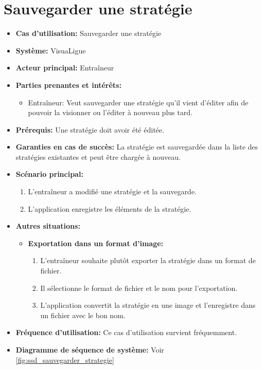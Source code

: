\newpage
\section{Sauvegarder une stratégie}
\label{sec:exporter_une_strategie}
\begin{itemize}
    \item \textbf{Cas d'utilisation:} Sauvegarder une strat\'egie
    \item \textbf{Syst\`eme:} VisuaLigue
    \item \textbf{Acteur principal:} Entra\^ineur
    \item \textbf{Parties prenantes et int\'er\^ets:}
        \begin{itemize}
            \item Entraîneur: Veut sauvegarder une stratégie qu'il vient d'éditer afin de pouvoir la visionner ou l'éditer à nouveau plus tard.
        \end{itemize}
    \item \textbf{Pr\'erequis:} Une stratégie doit avoir été éditée.
    \item \textbf{Garanties en cas de succ\`es:} La stratégie est sauvegardée dans la liste des stratégies existantes et peut être chargée à nouveau.
    \item \textbf{Sc\'enario principal:}
        \begin{enumerate}
            \item L'entra\^ineur a modifié une strat\'egie et la sauvegarde.
            \item L'application enregistre les \'el\'ements de la strat\'egie.
        \end{enumerate}
    \item \textbf{Autres situations:}
        \begin{itemize}
            \item \textbf{Exportation dans un format d'image:}
                \begin{enumerate}
                    \item L'entra\^ineur souhaite plut\^ot exporter la strat\'egie dans un format de fichier.
                    \item Il s\'electionne le format de fichier et le nom pour l'exportation.
                    \item L'application convertit la strat\'egie en une image et l'enregistre dans un fichier avec le bon nom.
                \end{enumerate}
        \end{itemize}
    \item \textbf{Fréquence d'utilisation:} Ce cas d'utilisation survient fréquemment.
    \item \textbf{Diagramme de s\'equence de syst\`eme:} Voir \ref{fig:ssd_sauvegarder_strategie}
\end{itemize}

